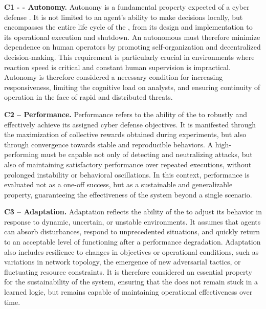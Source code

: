 \noindent
\textbf{C1 - - Autonomy.} \quad
Autonomy is a fundamental property expected of a cyber defense . It is not limited to an agent's ability to make decisions locally, but encompasses the entire life cycle of the , from its design and implementation to its operational execution and shutdown. An autonomous  must therefore minimize dependence on human operators by promoting self-organization and decentralized decision-making. This requirement is particularly crucial in environments where reaction speed is critical and constant human supervision is impractical. Autonomy is therefore considered a necessary condition for increasing responsiveness, limiting the cognitive load on analysts, and ensuring continuity of operation in the face of rapid and distributed threats.

\medskip

\noindent
\textbf{C2 -- Performance.} \quad
Performance refers to the ability of the  to robustly and effectively achieve its assigned cyber defense objectives. It is manifested through the maximization of collective rewards obtained during experiments, but also through convergence towards stable and reproducible behaviors. A high-performing  must be capable not only of detecting and neutralizing attacks, but also of maintaining satisfactory performance over repeated executions, without prolonged instability or behavioral oscillations. In this context, performance is evaluated not as a one-off success, but as a sustainable and generalizable property, guaranteeing the effectiveness of the system beyond a single scenario.

\medskip

\noindent
\textbf{C3 -- Adaptation.} \quad
Adaptation reflects the ability of the  to adjust its behavior in response to dynamic, uncertain, or unstable environments. It assumes that agents can absorb disturbances, respond to unprecedented situations, and quickly return to an acceptable level of functioning after a performance degradation. Adaptation also includes resilience to changes in objectives or operational conditions, such as variations in network topology, the emergence of new adversarial tactics, or fluctuating resource constraints. It is therefore considered an essential property for the sustainability of the system, ensuring that the  does not remain stuck in a learned logic, but remains capable of maintaining operational effectiveness over time.

